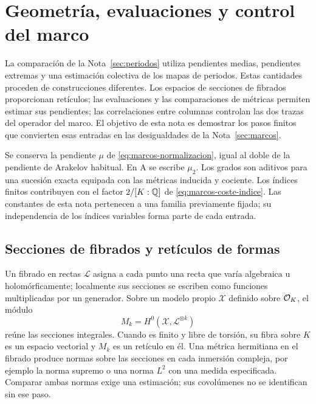\section{Geometría, evaluaciones y control del marco}
\label{sec:geometria}

La comparación de la Nota~\ref{sec:periodos} utiliza pendientes medias,
pendientes extremas y una estimación colectiva de los mapas de periodos.
Estas cantidades proceden de construcciones diferentes. Los espacios de
secciones de fibrados proporcionan retículos; las evaluaciones y las
comparaciones de métricas permiten estimar sus pendientes; las correlaciones
entre columnas controlan las dos trazas del operador del marco.
El objetivo de esta nota es demostrar los pasos finitos que convierten
esas entradas en las desigualdades de la Nota~\ref{sec:marcos}.

Se conserva la pendiente $\mu$ de \eqref{eq:marcos-normalizacion},
igual al doble de la pendiente de Arakelov habitual. En A se escribe
$\mu_2$. Los grados son aditivos para una sucesión exacta equipada
con las métricas inducida y cociente. Los índices finitos contribuyen
con el factor $2/[K:\mathbb{Q}]$ de \eqref{eq:marcos-coste-indice}.
Las constantes de esta nota pertenecen a una familia previamente fijada;
su independencia de los índices variables forma parte de cada entrada.


\subsection{Secciones de fibrados y retículos de formas}

Un fibrado en rectas $\mathcal L$ asigna a cada punto una recta que
varía algebraica u holomórficamente; localmente sus secciones se escriben
como funciones multiplicadas por un generador. Sobre un modelo propio
$\mathcal X$ definido sobre $\mathcal{O}_K$, el módulo
\[
 M_k=H^0(\mathcal X,\mathcal L^{\otimes k})
\]
reúne las secciones integrales. Cuando es finito y libre de torsión,
su fibra sobre $K$ es un espacio vectorial y $M_k$ es un retículo en él.
Una métrica hermitiana en el fibrado produce normas sobre las secciones
en cada inmersión compleja, por ejemplo la norma supremo o una norma
$L^2$ con una medida especificada. Comparar ambas normas exige una
estimación; sus covolúmenes no se identifican sin ese paso.

